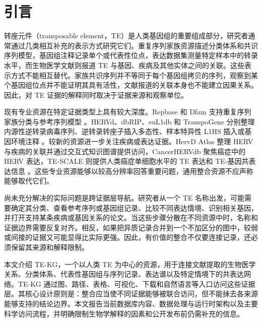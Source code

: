 \section{引言}

转座元件（transposable element，TE）是人类基因组的重要组成部分，研究者通常通过几类相互补充的表示方式研究它们。重复序列家族资源描述分类体系和共识序列模型，基因组注释记录单个或代表性位点，表达数据集测量特定样本中的转录水平，而生物医学文献则报道 TE 与基因、疾病及其他实体之间的关联。这些表示方式不能相互替代。家族共识序列并不等同于每个基因组拷贝的序列，观察到某个基因组位点并不能证明其具有活性，文献报道的关联本身也不能建立因果关系。因此，对 TE 证据的解释同时取决于证据来源和观察单位。

现有专业资源在特定证据类型上具有较大深度。Repbase 和 Dfam 支持重复序列家族分类与参考序列模型 \citep{Bao2015Repbase,Kojima2018HumanRepbase,Wheeler2013Dfam}。HERVd、dbRIP、euL1db 和 TranspoGene 分别整理内源性逆转录病毒序列、逆转录转座子插入多态性、样本特异性 L1HS 插入或基因环境注释 \citep{Paces2002HERVd,Wang2006dbRIP,Mir2015euL1db,Levy2008TranspoGene}。较新的资源进一步关注疾病或表达证据。HervD Atlas 整理 HERV 与疾病的关联并通过交互式知识图谱提供访问，CancerHERVdb 聚焦癌症中的 HERV 表达，TE-SCALE 则提供人类癌症单细胞水平的 TE 表达和 TE-基因共表达信息 \citep{Li2024HervDAtlas,Stricker2023CancerHERVdb,Meng2026TESCALE}。这些专业资源能够以较高分辨率回答重要问题，通用整合资源不应声称能够取代它们。

尚未充分解决的实际问题是跨证据层导航。研究者从一个 TE 名称出发，可能需要确定其分类、查看参考序列或基因组记录、比较不同表达情境、识别相关基因，并打开支持某条疾病或基因关系的论文。当这些步骤分散在不同资源中时，名称和证据边界需要反复对齐。相反，如果把异质记录合并到一个不加区分的图中，较弱或间接的证据又可能显得比实际更强。因此，有价值的整合不仅要连接记录，还必须保留其来源和解释限制。

本文介绍 TE-KG，一个以人类 TE 为中心的资源，用于连接文献提取的生物医学关系、分类体系、代表性基因组与序列记录、表达谱以及特定情境下的共表达网络。TE-KG 通过图、路径、表格、可视化、下载和自然语言等入口访问这些证据层。其核心设计原则是：整合应当使不同证据能够被联合访问，但不能抹去各来源能够支持的结论边界。本文报告当前数据库内容、数据处理与运行时架构以及主要科学访问流程，并明确限制生物学解释的因素和公开发布前仍需补充的信息。
